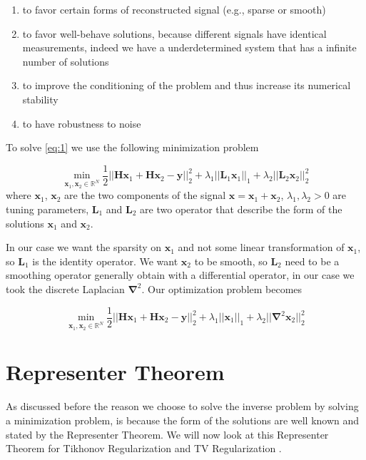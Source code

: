 \documentclass[a4paper,11pt,oneside]{report}
\theoremstyle{named}
\begin{document}
\begin{enumerate}
    \item to favor certain forms of reconstructed signal (e.g., sparse or smooth)
    \item to favor well-behave solutions, because different signals have identical measurements, indeed we have a underdetermined system that has a infinite number of solutions
    \item to improve the conditioning of the problem and thus increase its numerical stability
    \item to have robustness to noise
\end{enumerate}

To solve \eqref{eq:1} we use the following minimization problem

\begin{equation} \label{eq:min}
    \min_{\boldsymbol{x}_1,\boldsymbol{x}_2 \in \mathbb{R}^N} \frac{1}{2} ||\boldsymbol{H x}_1 + \boldsymbol{H x}_2 - \boldsymbol{y}||_2^2 + \lambda_1 ||\boldsymbol{L}_1 \boldsymbol{x}_1||_1 + \lambda_2 ||\boldsymbol{L}_2 \boldsymbol{x}_2||_2^2
\end{equation}
where $\boldsymbol{x}_1$, $\boldsymbol{x}_2$ are the two components of the signal $\boldsymbol{x} = \boldsymbol{x}_1 + \boldsymbol{x}_2$, $\lambda_1, \lambda_2 > 0$ are tuning parameters, $\boldsymbol{L}_1$ and $\boldsymbol{L}_2$ are two operator that describe the form of the solutions $\boldsymbol{x}_1$ and $\boldsymbol{x}_2$.

In our case we want the sparsity on $\boldsymbol{x}_1$ and not some linear transformation of $\boldsymbol{x}_1$, so $\boldsymbol{L}_1$ is the identity operator. We want $\boldsymbol{x}_2$ to be smooth, so $\boldsymbol{L}_2$ need to be a smoothing 
operator generally obtain with a differential operator, in our case we took the discrete Laplacian $\boldsymbol{\nabla}^2$. Our optimization problem becomes

\begin{equation} \label{eq:2}
    \min_{\boldsymbol{x}_1,\boldsymbol{x}_2 \in \mathbb{R}^N} \frac{1}{2} ||\boldsymbol{H x}_1 + \boldsymbol{H x}_2 - \boldsymbol{y}||_2^2 + \lambda_1 ||\boldsymbol{x}_1||_1 + \lambda_2 || \boldsymbol{\nabla}^2 \boldsymbol{x}_2||_2^2
\end{equation}

\section{Representer Theorem}
As discussed before the reason we choose to solve the inverse problem by solving a 
minimization problem, is because the form of the solutions are well known and stated by 
the Representer Theorem. We will now look at this Representer Theorem for Tikhonov 
Regularization and TV Regularization \cite{Slides}.
\end{document}
